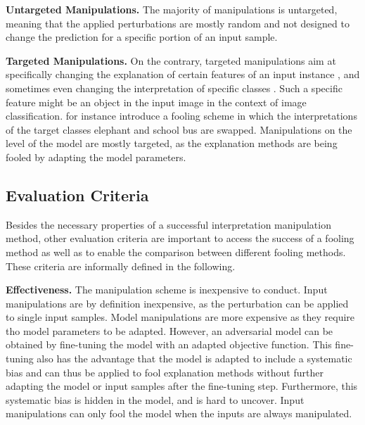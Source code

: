 \documentclass[sigconf]{acmart}
\newcommand{\mypar}[1]{\vspace{0.2cm}\noindent\textbf{#1}}
\begin{document}
\mypar{Untargeted Manipulations.} 
The majority of manipulations is untargeted, meaning that the applied perturbations are mostly random and not designed to change the prediction for a specific portion of an input sample. 

\mypar{Targeted Manipulations.} 
On the contrary, targeted manipulations aim at specifically changing the explanation of certain features of an input instance \cite{fooling_nn_interpreters}, and sometimes even changing the interpretation of specific classes \cite{simonyan2013deep}. Such a specific feature might be an object in the input image in the context of image classification. \cite{fooling_nn_interpreters} for instance introduce a fooling scheme in which the interpretations of the target classes elephant and school bus are swapped. 
Manipulations on the level of the model are mostly targeted, as the explanation methods are being fooled by adapting the model parameters. 


\subsection{Evaluation Criteria}
\label{subsec:eval_criteria_manipulations}
Besides the necessary properties of a successful interpretation manipulation method, other evaluation criteria are important to access the success of a fooling method as well as to enable the comparison between different fooling methods. These criteria are informally defined in the following.

\mypar{Effectiveness.} The manipulation scheme is inexpensive to conduct. Input manipulations are by definition inexpensive, as the perturbation can be applied to single input samples. Model manipulations are more expensive as they require tho model parameters to be adapted. However, an adversarial model can be obtained by fine-tuning the model with an adapted objective function. This fine-tuning also has the advantage that the model is adapted to include a systematic bias and can thus be applied to fool explanation methods without further adapting the model or input samples after the fine-tuning step. Furthermore, this systematic bias is hidden in the model, and is hard to uncover. Input manipulations can only fool the model when the inputs are always manipulated. 
\end{document}
